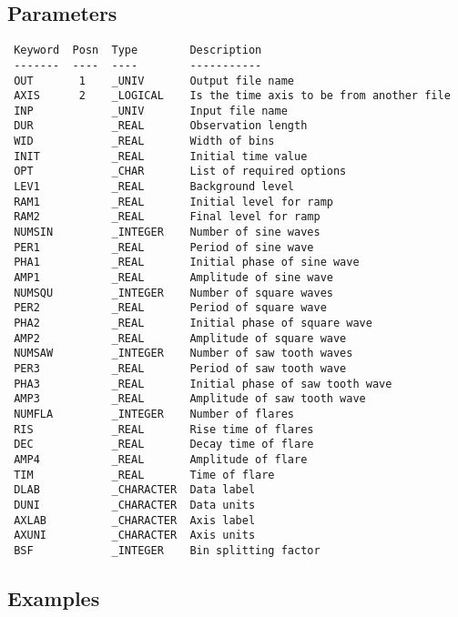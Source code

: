 \documentclass{book}
\renewcommand{\_}{{\tt\char'137}}     %
\begin{document}
\subsection{Parameters}
\begin{verbatim}
 Keyword  Posn  Type        Description
 -------  ----  ----        -----------
 OUT       1    _UNIV       Output file name
 AXIS      2    _LOGICAL    Is the time axis to be from another file
 INP            _UNIV       Input file name
 DUR            _REAL       Observation length
 WID            _REAL       Width of bins
 INIT           _REAL       Initial time value
 OPT            _CHAR       List of required options
 LEV1           _REAL       Background level
 RAM1           _REAL       Initial level for ramp
 RAM2           _REAL       Final level for ramp
 NUMSIN         _INTEGER    Number of sine waves
 PER1           _REAL       Period of sine wave
 PHA1           _REAL       Initial phase of sine wave
 AMP1           _REAL       Amplitude of sine wave
 NUMSQU         _INTEGER    Number of square waves
 PER2           _REAL       Period of square wave
 PHA2           _REAL       Initial phase of square wave
 AMP2           _REAL       Amplitude of square wave
 NUMSAW         _INTEGER    Number of saw tooth waves
 PER3           _REAL       Period of saw tooth wave
 PHA3           _REAL       Initial phase of saw tooth wave
 AMP3           _REAL       Amplitude of saw tooth wave
 NUMFLA         _INTEGER    Number of flares
 RIS            _REAL       Rise time of flares
 DEC            _REAL       Decay time of flare
 AMP4           _REAL       Amplitude of flare
 TIM            _REAL       Time of flare
 DLAB           _CHARACTER  Data label
 DUNI           _CHARACTER  Data units
 AXLAB          _CHARACTER  Axis label
 AXUNI          _CHARACTER  Axis units
 BSF            _INTEGER    Bin splitting factor

\end{verbatim}\subsection{Examples}
\end{document}
